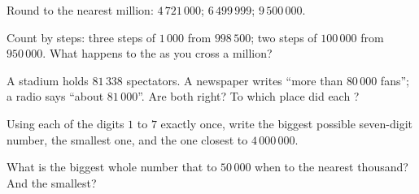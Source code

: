 \begin{exercise}[$\star$]\label{exo:g4:numbers:7}
Round to the nearest million: $4\,721\,000$; \quad $6\,499\,999$;
\quad $9\,500\,000$.
\end{exercise}

\begin{exercise}[$\star$]\label{exo:g4:numbers:8}
Count by steps: three steps of $1\,000$ from $998\,500$; two steps
of $100\,000$ from $950\,000$. What happens to the  as you
cross a million?
\end{exercise}

\begin{exercise}[$\star$]\label{exo:g4:numbers:9}
A stadium holds $81\,338$ spectators. A newspaper writes ``more than
$80\,000$ fans''; a radio says ``about $81\,000$''. Are both
right? To which place did each ?
\end{exercise}

\begin{exercise}[$\star\star$]\label{exo:g4:numbers:10}
Using each of the digits $1$ to $7$ exactly once, write the biggest
possible seven-digit number, the smallest one, and the one closest to
$4\,000\,000$.
\end{exercise}

\begin{exercise}[$\star\star$]\label{exo:g4:numbers:11}
What is the biggest whole number that  to $50\,000$ when
 to the nearest thousand? And the smallest?
\end{exercise}
